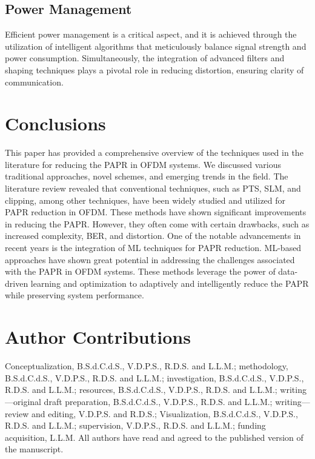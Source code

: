 \documentclass[conference]{IEEEtran}
\begin{document}
\subsection{Power Management}
Efficient power management is a critical aspect, and it is achieved through the utilization of intelligent algorithms that meticulously balance signal strength and power consumption. Simultaneously, the integration of advanced filters and shaping techniques plays a pivotal role in reducing distortion, ensuring clarity of communication.

\section{Conclusions}
This paper has provided a comprehensive overview of the techniques used in the literature for reducing the PAPR in OFDM systems. We discussed various traditional approaches, novel schemes, and emerging trends in the field. The literature review revealed that conventional techniques, such as PTS, SLM, and clipping, among other techniques, have been widely studied and utilized for PAPR reduction in OFDM. These methods have shown significant improvements in reducing the PAPR. However, they often come with certain drawbacks, such as increased complexity, BER, and distortion. One of the notable advancements in recent years is the integration of ML techniques for PAPR reduction. ML-based approaches have shown great potential in addressing the challenges associated with the PAPR in OFDM systems. These methods leverage the power of data-driven learning and optimization to adaptively and intelligently reduce the PAPR while preserving system performance.

\section*{Author Contributions}
Conceptualization, B.S.d.C.d.S., V.D.P.S., R.D.S. and L.L.M.; methodology, B.S.d.C.d.S., V.D.P.S., R.D.S. and L.L.M.; investigation, B.S.d.C.d.S., V.D.P.S., R.D.S. and L.L.M.; resources, B.S.d.C.d.S., V.D.P.S., R.D.S. and L.L.M.; writing---original draft preparation, B.S.d.C.d.S., V.D.P.S., R.D.S. and L.L.M.; writing---review and editing, V.D.P.S. and R.D.S.; Visualization, B.S.d.C.d.S., V.D.P.S., R.D.S. and L.L.M.; supervision, V.D.P.S., R.D.S. and L.L.M.; funding acquisition, L.L.M. All authors have read and agreed to the published version of the manuscript.
\end{document}
